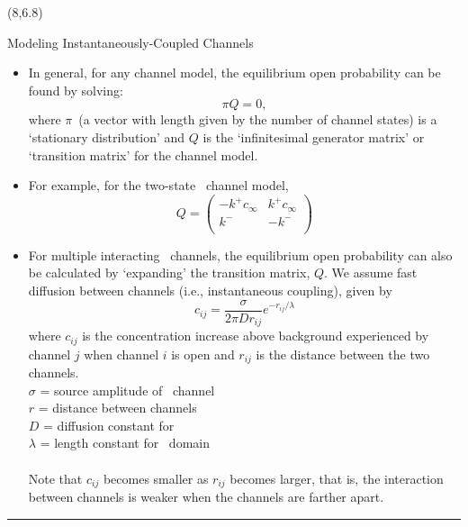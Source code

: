 \documentclass[a0]{a0poster}
\def\CHead#1{\begin{center} {\LARGE\color{DarkBlue} #1} \end{center} \bigskip}
\begin{document}
\begin{textblock}{7}(8,6.8)
\CHead{Modeling Instantaneously-Coupled Channels}
\begin{itemize}
\item In general, for any channel model, the equilibrium open 
probability can be found by solving: 
\[ 
\pi Q = 0,
\]
\vspace{0.1in} 
where $\pi$\ (a vector with length given by the number of channel states) 
is a `stationary distribution' and $Q$ is the `infinitesimal generator matrix' or  `transition matrix'
for the channel model. 

\item For example, for the two-state \Ca\ channel model, 
\[
Q = \left( \begin{array}{cc}
-k^+ c_\infty & k^+ c_\infty \\
k^- & -k^- \\
\end{array}
\right) 
\]

\item For multiple interacting \Ca\ channels, the equilibrium open probability can also be calculated
by `expanding' the transition matrix, $Q$. 
We assume fast diffusion between channels (i.e., instantaneous coupling), given by 
\[ c_{ij} = \frac {\sigma} {2\pi D r_{ij}} e^{-r_{ij}/\lambda} \]
where 
$c_{ij}$ is the concentration increase above background experienced by channel
$j$ when channel $i$ is open and 
$r_{ij}$ is the distance between the two channels. 
\\

$\sigma$ = source amplitude of \Ca\ channel \\
$r$ = distance between channels \\
$D$ = diffusion constant for \Ca \\ 
$\lambda$ = length constant for \Ca\ domain \\
\\
Note that $c_{ij}$ becomes smaller as $r_{ij}$ becomes larger, 
that is, the interaction between channels is weaker when 
the channels are farther apart.



\end{itemize}
\bigskip
\hrule
\end{textblock}


\end{document}
